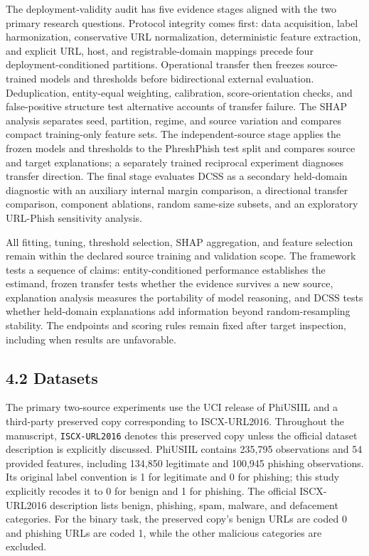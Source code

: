 \documentclass[
  10pt,
]{article}
\begin{document}
The deployment-validity audit has five evidence stages aligned with the
two primary research questions. Protocol integrity comes first: data
acquisition, label harmonization, conservative URL normalization,
deterministic feature extraction, and explicit URL, host, and
registrable-domain mappings precede four deployment-conditioned
partitions. Operational transfer then freezes source-trained models and
thresholds before bidirectional external evaluation. Deduplication,
entity-equal weighting, calibration, score-orientation checks, and
false-positive structure test alternative accounts of transfer failure.
The SHAP analysis separates seed, partition, regime, and source
variation and compares compact training-only feature sets. The
independent-source stage applies the frozen models and thresholds to the
PhreshPhish test split and compares source and target explanations; a
separately trained reciprocal experiment diagnoses transfer direction.
The final stage evaluates DCSS as a secondary held-domain diagnostic
with an auxiliary internal margin comparison, a directional transfer
comparison, component ablations, random same-size subsets, and an
exploratory URL-Phish sensitivity analysis.

All fitting, tuning, threshold selection, SHAP aggregation, and feature
selection remain within the declared source training and validation
scope. The framework tests a sequence of claims: entity-conditioned
performance establishes the estimand, frozen transfer tests whether the
evidence survives a new source, explanation analysis measures the
portability of model reasoning, and DCSS tests whether held-domain
explanations add information beyond random-resampling stability. The
endpoints and scoring rules remain fixed after target inspection,
including when results are unfavorable.

\subsection{4.2 Datasets}\label{datasets}

The primary two-source experiments use the UCI release of PhiUSIIL and a
third-party preserved copy corresponding to ISCX-URL2016. Throughout the
manuscript, \texttt{ISCX-URL2016} denotes this preserved copy unless the
official dataset description is explicitly discussed. PhiUSIIL contains
235,795 observations and 54 provided features, including 134,850
legitimate and 100,945 phishing observations\citep{Prasad2024}. Its
original label convention is 1 for legitimate and 0 for phishing; this
study explicitly recodes it to 0 for benign and 1 for phishing. The
official ISCX-URL2016 description lists benign, phishing, spam, malware,
and defacement categories\citep{Mamun2016}. For the binary task, the
preserved copy's benign URLs are coded 0 and phishing URLs are coded 1,
while the other malicious categories are excluded.
\end{document}
